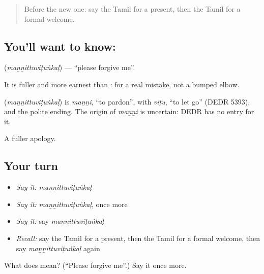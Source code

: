 \label{lesson:TA-C99-forgive}



\begin{quote}
Before the new one: say the Tamil for a present, then the Tamil for a formal welcome.
\end{quote}

\subsection*{You'll want to know: }
\textbf{} (\emph{maṉṉittuviṭuṅkaḷ}) — \textquotedblleft{}please forgive me\textquotedblright{}.

It is fuller and more earnest than \textbf{}: for a real mistake, not a bumped elbow.

\begin{cousinweb}
\textbf{} (\emph{maṉṉittuviṭuṅkaḷ}) is \emph{maṉṉi}, \textquotedblleft{}to pardon\textquotedblright{}, with \emph{viṭu}, \textquotedblleft{}to let go\textquotedblright{} (DEDR 5393), and the polite ending. The origin of \emph{maṉṉi} is uncertain: DEDR has no entry for it.
\end{cousinweb}

\begin{grammarlens}[title={What you've built}]
A fuller apology.
\end{grammarlens}

\subsection*{Your turn}
\begin{itemize}
\raggedright
  \item \emph{Say it:} \emph{maṉṉittuviṭuṅkaḷ}
  \item \emph{Say it:} \emph{maṉṉittuviṭuṅkaḷ}, once more
  \item \emph{Say it:} say \emph{maṉṉittuviṭuṅkaḷ}
  \item \emph{Recall:} say the Tamil for a present, then the Tamil for a formal welcome, then say \emph{maṉṉittuviṭuṅkaḷ} again
\end{itemize}

\begin{tcolorbox}[breakable,colback=teal!4,colframe=teal!35!black,title={Before you move on}]
What does  mean? (\textquotedblleft{}Please forgive me\textquotedblright{}.) Say it once more.
\end{tcolorbox}
